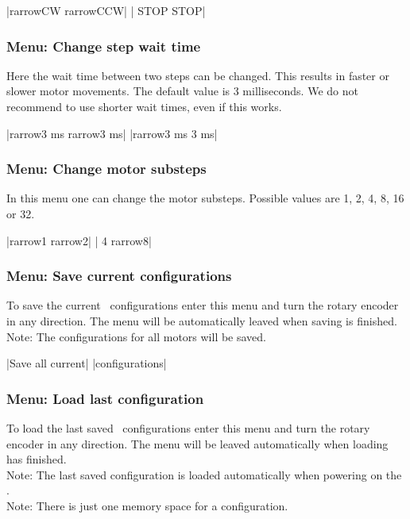 |{rarrow}CW     {rarrow}CCW|
| STOP    STOP|

\subsubsection{Menu: Change step wait time}
\label{menu_step_wait_time}
Here the wait time between two steps can be changed. This results in faster or slower motor movements. The default value is 3 milliseconds. We do not recommend to use shorter wait times, even if this works.

|{rarrow}3 ms   {rarrow}3 ms|
|{rarrow}3 ms    3 ms|

\subsubsection{Menu: Change motor substeps}
In this menu one can change the motor substeps. Possible values are 1, 2, 4, 8, 16 or 32.

|{rarrow}1      {rarrow}2|
| 4      {rarrow}8|


\subsubsection{Menu: Save current configurations}
\label{menu_save}
To save the current \productName ~configurations enter this menu and turn the rotary encoder in any direction. The menu will be automatically leaved when saving is finished.\\
Note: The configurations for all motors will be saved.

|Save all current|
|configurations|

\subsubsection{Menu: Load last configuration}
To load the last saved \productName ~configurations enter this menu and turn the rotary encoder in any direction. The menu will be leaved automatically when loading has
finished.\\
Note: The last saved configuration is loaded automatically when powering on the \productName.\\
Note: There is just one memory space for a configuration.

